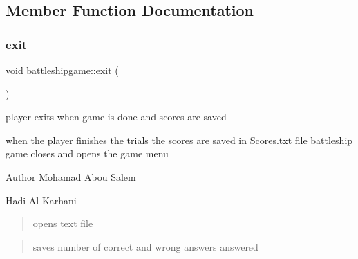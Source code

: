 \subsection{Member Function Documentation}
\mbox{\label{classbattleshipgame_a498809fd1ed17350a8d7a459bbf734ae}} 
\subsubsection{\texorpdfstring{exit}{exit}}
{\footnotesize\ttfamily void battleshipgame\+::exit (\begin{DoxyParamCaption}{ }\end{DoxyParamCaption})\hspace{0.3cm}{\ttfamily [slot]}}



player exits when game is done and scores are saved 

when the player finishes the trials the scores are saved in Scores.\+txt file battleship game closes and opens the game menu

\begin{DoxyAuthor}{Author}
Mohamad Abou Salem 

Hadi Al Karhani 
\end{DoxyAuthor}
\begin{quote}
opens text file \end{quote}


\begin{quote}
saves number of correct and wrong answers answered \end{quote}


